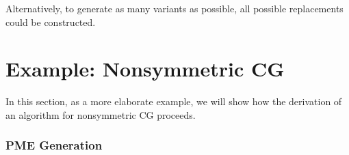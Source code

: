 Alternatively, to generate as many variants as possible, all possible replacements could be constructed.

%
%
%

\section{Example: Nonsymmetric CG}
\label{sec:derivationOfAlgorithmsExample}

In this section, as a more elaborate example, we will show how the derivation of an algorithm for nonsymmetric CG proceeds.

\subsubsection{PME Generation}

